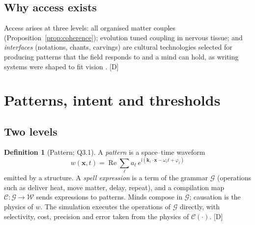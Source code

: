 \documentclass[11pt,a4paper]{article}
\numberwithin{equation}{section}
\theoremstyle{definition}
\newtheorem{definition}{Definition}[section]
\theoremstyle{plain}
\theoremstyle{remark}
\newcommand{\ii}{\mathrm i}
\newcommand{\tagD}{\textcolor{tag}{\textsf{[D]}}}
\begin{document}
\subsection{Why access exists}
Access arises at three levels: all organised matter couples (Proposition~\ref{prop:coherence}); evolution tuned coupling in nervous tissue; and \emph{interfaces} (notations, chants, carvings) are cultural technologies selected for producing patterns that the field responds to and a mind can hold, as writing systems were shaped to fit vision \cite{dehaene}. \tagD

\section{Patterns, intent and thresholds}\label{sec:pattern}

\subsection{Two levels}
\begin{definition}[Pattern; Q3.1]
A \emph{pattern} is a space--time waveform
\begin{equation}
w(\bm x,t)=\operatorname{Re}\sum_{\ell} a_\ell\, e^{\ii(\bm k_\ell\cdot\bm x-\omega_\ell t+\varphi_\ell)}
\end{equation}
emitted by a structure. A \emph{spell expression} is a term of the grammar $\mathcal G$ (operations such as deliver heat, move matter, delay, repeat), and a compilation map $\mathcal C:\mathcal G\to\mathcal W$ sends expressions to patterns. Minds compose in $\mathcal G$; causation is the physics of $w$. The simulation executes the operations of $\mathcal G$ directly, with selectivity, cost, precision and error taken from the physics of $\mathcal C(\cdot)$. \tagD
\end{definition}
\end{document}
